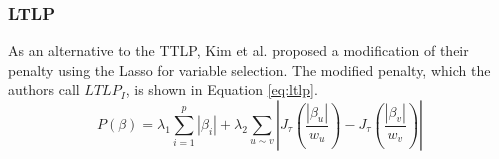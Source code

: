 \subsubsection{LTLP} \label{sec:ltlp}
As an alternative to the TTLP, Kim et al. proposed a modification of their penalty using the Lasso for variable selection. The modified penalty, which the authors call $LTLP_I$, is shown in Equation \ref{eq:ltlp}.
\begin{equation} \label{eq:ltlp}
P(\beta) = \lambda_1 \sum_{i=1}^{p}\left|\beta_i\right| + \lambda_2 \sum_{u \sim v} \left|J_\tau\left(\frac{|\beta_u|}{w_u}\right)-J_\tau\left(\frac{|\beta_v|}{w_v}\right)\right|
\end{equation}
